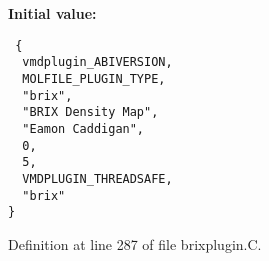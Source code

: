 {\bf Initial value:}

\footnotesize\begin{verbatim} {
  vmdplugin_ABIVERSION,   
  MOLFILE_PLUGIN_TYPE,    
  "brix",                 
  "BRIX Density Map",     
  "Eamon Caddigan",       
  0,                      
  5,                      
  VMDPLUGIN_THREADSAFE,   
  "brix"                  
}\end{verbatim}\normalsize 


Definition at line 287 of file brixplugin.C.
